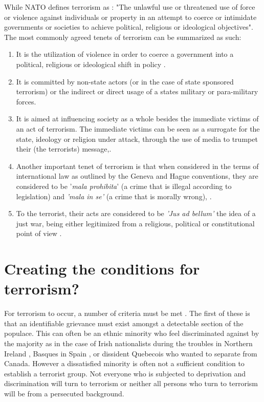 While NATO defines terrorism as \citep{chase2013defining}:
"The unlawful use or threatened use of force or violence against individuals or property in an attempt to coerce or intimidate governments or societies to achieve political, religious or ideological objectives".
The most commonly agreed tenets of terrorism can be summarized as such:
\begin{enumerate}
\item It is the utilization of violence in order to coerce a government into a political, religious or ideological shift in policy \citep{chase2013defining}.
\item It is committed by non-state actors (or in the case of state sponsored terrorism) or the indirect or direct usage of a states military or para-military forces.
\item It is aimed at influencing society as a whole besides the immediate victims of an act of terrorism. The immediate victims can be seen as a surrogate for the state, ideology or religion under attack, through the use of media to trumpet their (the terrorists) message,\citep{el2014terrorist}.
\item Another important tenet of terrorism is that when considered in the terms of international law as outlined by the Geneva and Hague conventions, they are considered to be '\textit{mala prohibita}' (a crime that is illegal according to legislation) and \textit{'mala in se'} (a crime that is morally wrong), \citep{ganor2002defining}.
\item To the terrorist, their acts are considered to be \textit{'Jus ad bellum'} the idea of a just war, being either legitimized from a religious, political or constitutional point of view \citep{kennedy1999one}. 
\end{enumerate}

\section{Creating the conditions for terrorism?}

For terrorism to occur, a number of criteria must be met \citep{crenshaw1981causes}. The first of these is that an identifiable grievance must exist amongst a detectable section of the populace. This can often be an ethnic minority who feel discriminated against by the majority as in the case of Irish nationalists during the troubles in Northern Ireland \citep{moxon1983nation}, Basques in Spain \citep{llera1993eta}, or dissident Quebecois \citep{ross1995rise} who wanted to separate from Canada. However a dissatisfied minority is often not a sufficient condition to establish a terrorist group. Not everyone who is subjected to deprivation and discrimination will turn to terrorism or neither all persons who turn to terrorism will be from a persecuted background. 

